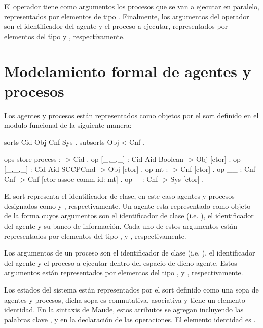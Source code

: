 El operador \cde{_||_} tiene como argumentos los procesos que se van a ejecutar en paralelo, representados por elementos de tipo . Finalmente, los argumentos del operador \cde{<_>[_]} son el identificador del agente y el proceso a ejecutar, representados por elementos del tipo  y , respectivamente. 

\section{Modelamiento formal de agentes y procesos}
\label{state.rew}

Los agentes y procesos est\'an representados como objetos por el sort  definido en el modulo funcional  de la siguiente manera:

\begin{maude}
  sorts Cid Obj Cnf Sys .
  subsorts Obj < Cnf .
  
  ops store process : -> Cid .
  op [_,_,_] : Cid Aid Boolean -> Obj [ctor] .
  op [_,_,_] : Cid Aid SCCPCmd -> Obj [ctor] .
  op mt : -> Cnf [ctor] .
  op __ : Cnf Cnf -> Cnf [ctor assoc comm id: mt] .
  op {_} : Cnf -> Sys [ctor] .
\end{maude}

El sort  representa el identificador de clase, en este caso agentes y procesos designados como  y , respectivamente. Un agente esta representado como objeto de la forma \cde{[_,_,_]} cuyos argumentos son el identificador de clase (i.e. ), el identificador del agente y su banco de informaci\'on. Cada uno de estos argumentos est\'an representados por elementos del tipo ,  y , respectivamente.

Los argumentos de un proceso son el identificador de clase (i.e. ), el identificador del agente y el proceso a ejecutar dentro del espacio de dicho agente. Estos argumentos est\'an representados por elementos del tipo ,  y , respectivamente.

Los estados del sistema est\'an representados por el sort  definido como una sopa de agentes y procesos, dicha sopa es conmutativa, asociativa y tiene un elemento identidad. En la sintaxis de Maude, estos atributos se agregan incluyendo las palabras clave ,  y  en la declaraci\'on de las operaciones. El elemento identidad es .

